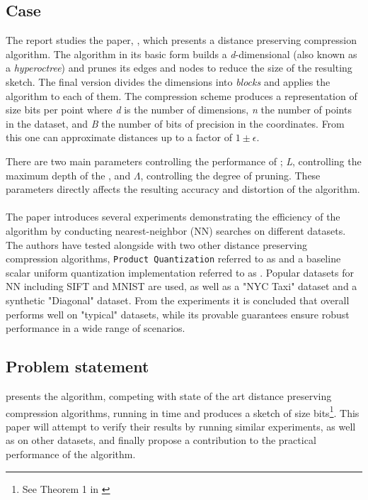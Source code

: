 \subsection{Case} %
The report studies the paper, \cite{wagner17}, which presents a distance preserving compression algorithm. The algorithm in its basic form builds a \textit{d}-dimensional \qt{}(also known as a \textit{hyperoctree}) and prunes its edges and nodes to reduce the size of the resulting sketch. The final version divides the dimensions into \textit{blocks} and applies the algorithm to each of them. The compression scheme produces a representation of size  bits per point where \textit{d} is the number of dimensions, \textit{n} the number of points in the dataset, and \textit{B} the number of bits of precision in the coordinates. From this one can approximate distances up to a factor of $1\pm\epsilon$. 

There are two main parameters controlling the performance of \qs{}; \textit{L}, controlling the maximum depth of the \qt{}, and $\Lambda$, controlling the degree of pruning. These parameters directly affects the resulting accuracy and distortion of the algorithm.
\\
\\
The paper introduces several experiments demonstrating the efficiency of the algorithm by conducting nearest-neighbor (NN) searches on different datasets. The authors have tested \qs{} alongside with two other distance preserving compression algorithms, \texttt{Product Quantization} referred to as \pq{} and a baseline scalar uniform quantization implementation referred to as \gr{}. Popular datasets for NN including SIFT and MNIST are used, as well as a "NYC Taxi" dataset and a synthetic "Diagonal" dataset. From the experiments it is concluded that \qs{} overall performs well on "typical" datasets, while its provable guarantees ensure robust performance in a wide range of scenarios\cite[p. 2, l. 38-40]{wagner17}. 

\subsection{Problem statement} %
\label{intro:problemStatement}
\cite{wagner17} presents the \qs{} algorithm, competing with state of the art distance preserving compression algorithms, running in  time and produces a sketch of size  bits\footnote{See Theorem 1 in \cite[p. 3]{wagner17}}. This paper will attempt to verify their results by running similar experiments, as well as on other datasets, and finally propose a contribution to the practical performance of the \qs{} algorithm.



